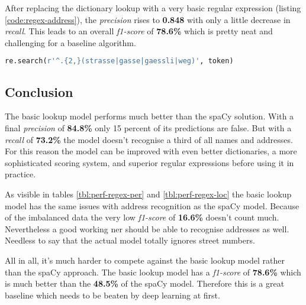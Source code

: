 After replacing the dictionary lookup with a very basic regular expression (listing \ref{code:regex-address}), the \emph{precision} rises to \textbf{0.848} with only
a little decrease in \emph{recall}. This leads to an overall \emph{f1-score} of \textbf{78.6\%} which is pretty neat and challenging for a baseline algorithm.

\begin{lstlisting}[language=Python, label={code:regex-address}, caption=Very basic regular expression for detecting addresses]
re.search(r'^.{2,}(strasse|gasse|gaessli|weg)', token)
\end{lstlisting}

\subsection{Conclusion}

The basic lookup model performs much better than the spaCy solution. With a final \emph{precision} of \textbf{84.8\%} only 15 percent of its predictions are false. But
with a \emph{recall} of \textbf{73.2\%} the model doesn't recognise a third of all names and addresses. For this reason the model can be improved with even better
dictionaries, a more sophisticated scoring system, and superior regular expressions before using it in practice.

As visible in tables \ref{tbl:perf-regex-per} and \ref{tbl:perf-regex-loc} the basic lookup model has the same issues with address recognition as the spaCy model. Because of the
imbalanced data the very low \emph{f1-score} of \textbf{16.6\%} doesn't count much. Nevertheless a good working \acrlong{ner} should be able to recognise addresses
as well. Needless to say that the actual model totally ignores street numbers.

All in all, it's much harder to compete against the basic lookup model rather than the spaCy approach. The basic lookup model has a \emph{f1-score} of \textbf{78.6\%} which is much better than the \textbf{48.5\%} of the spaCy model. Therefore this is a great baseline which needs to be beaten by deep learning at first.
